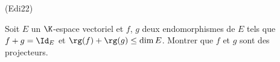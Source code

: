 \begin{tiny}(Edi22)\end{tiny} Soit $E$ un $\K$-espace vectoriel et $f$, $g$ deux endomorphismes de $E$ tels que $f+g=\Id_E$ et $\rg(f)+\rg(g)\leq \dim E$. Montrer que $f$ et $g$ sont des projecteurs.
